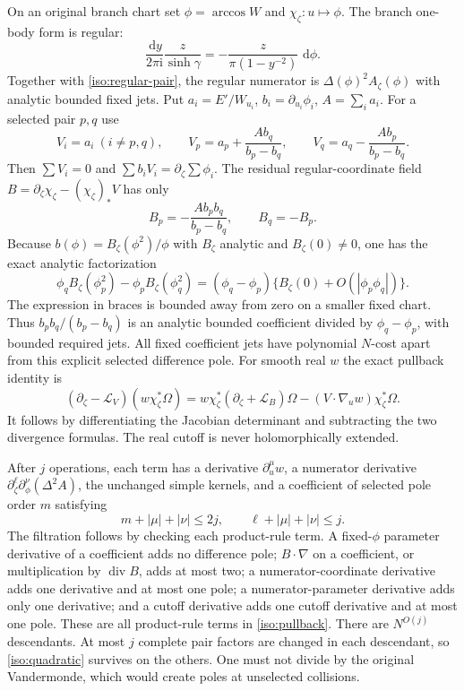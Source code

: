 \documentclass[11pt]{article}
\numberwithin{equation}{section}
\theoremstyle{definition}
\newcommand{\ii}{\mathrm i}
\newcommand{\dd}{\,\mathrm d}
\begin{document}
On an original branch chart set $\phi=\arccos W$ and
$\chi_\zeta:u\mapsto\phi$. The branch one-body form is regular:
\[
 \frac{\dd y}{2\pi\ii}\frac{z}{\sinh\gamma}
 =-\frac{z}{\pi(1-y^{-2})}\,\dd\phi.
\]
Together with \eqref{iso:regular-pair}, the regular numerator is
$\Delta(\phi)^2A_\zeta(\phi)$ with analytic bounded fixed jets.
Put $a_i=E'/W_{u_i}$, $b_i=\partial_{u_i}\phi_i$, $A=\sum_i a_i$.
For a selected pair $p,q$ use
\[
 V_i=a_i\ (i\ne p,q),\qquad
 V_p=a_p+\frac{Ab_q}{b_p-b_q},\qquad
 V_q=a_q-\frac{Ab_p}{b_p-b_q}.
\]
Then $\sum V_i=0$ and $\sum b_iV_i=\partial_\zeta\sum\phi_i$.
The residual regular-coordinate field
$B=\partial_\zeta\chi_\zeta-(\chi_\zeta)_*V$ has only
\[
 B_p=-\frac{Ab_pb_q}{b_p-b_q},\qquad B_q=-B_p.
\]
Because $b(\phi)=B_\zeta(\phi^2)/\phi$ with $B_\zeta$ analytic
and $B_\zeta(0)\ne0$, one has the exact analytic factorization
\[
 \phi_qB_\zeta(\phi_p^2)-\phi_pB_\zeta(\phi_q^2)
 =(\phi_q-\phi_p)
       \{B_\zeta(0)+O(|\phi_p\phi_q|)\}.
\]
The expression in braces is bounded away from zero on a smaller fixed
chart. Thus $b_pb_q/(b_p-b_q)$ is an analytic bounded coefficient
divided by $\phi_q-\phi_p$, with bounded required jets.
All fixed coefficient jets have polynomial
$N$-cost apart from this explicit selected difference pole.
For smooth real $w$ the exact pullback identity is
\begin{equation}
 (\partial_\zeta-\mathcal L_V)(w\chi_\zeta^*\Omega)
 =w\chi_\zeta^*(\partial_\zeta+\mathcal L_B)\Omega
 -(V\cdot\nabla_u w)\chi_\zeta^*\Omega.
 \label{iso:pullback}
\end{equation}
It follows by differentiating the Jacobian determinant and subtracting
the two divergence formulas. The real cutoff is never holomorphically
extended.

After $j$ operations, each term has a derivative
$\partial_u^\mu w$, a numerator derivative
$\partial_\zeta^\ell\partial_\phi^\nu(\Delta^2A)$, the unchanged
simple kernels, and a coefficient of selected pole order $m$ satisfying
\begin{equation}
 m+|\mu|+|\nu|\le2j,\qquad
 \ell+|\mu|+|\nu|\le j.
 \label{iso:filtration}
\end{equation}
The filtration follows by checking each product-rule term. A
fixed-$\phi$ parameter derivative of a coefficient adds no difference pole; $B\cdot\nabla$ on a coefficient,
or multiplication by $\operatorname{div}B$, adds at most two; a
numerator-coordinate derivative adds one derivative and at most one
pole; a numerator-parameter derivative adds only one derivative; and a
cutoff derivative adds one cutoff derivative and at most one pole.
These are all product-rule terms in \eqref{iso:pullback}.
There are $N^{O(j)}$ descendants. At most $j$ complete pair factors are
changed in each descendant, so \eqref{iso:quadratic} survives on the
others. One must not divide by the original Vandermonde, which would
create poles at unselected collisions.
\end{document}
